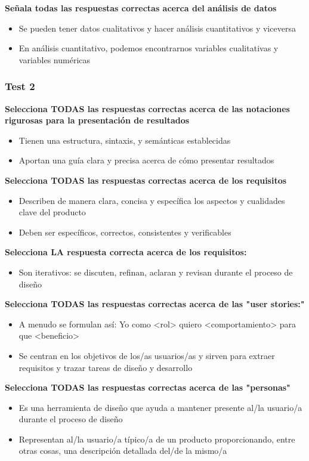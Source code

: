 \documentclass[12pt, twoside, openright]{report} %
\begin{document}
\textbf{Señala todas las respuestas correctas acerca del análisis de datos}
\begin{itemize}
	\item Se pueden tener datos cualitativos y hacer análisis cuantitativos y viceversa
	\item En análisis cuantitativo, podemos encontrarnos variables cualitativas y variables numéricas
\end{itemize}
\pagebreak
\subsubsection{Test 2}

\textbf{Selecciona TODAS las respuestas correctas acerca de las notaciones rigurosas para la presentación de resultados}
\begin{itemize}
	\item Tienen una estructura, sintaxis, y semánticas establecidas
	\item Aportan una guía clara y precisa acerca de cómo presentar resultados
\end{itemize}

\textbf{Selecciona TODAS las respuestas correctas acerca de los requisitos}
\begin{itemize}
	\item Describen de manera clara, concisa y específica los aspectos y cualidades clave del producto
	\item Deben ser específicos, correctos, consistentes y verificables
\end{itemize}

\textbf{Selecciona LA respuesta correcta acerca de los requisitos:}
\begin{itemize}
	\item Son iterativos: se discuten, refinan, aclaran y revisan durante el proceso de diseño
\end{itemize}

\textbf{Selecciona TODAS las respuestas correctas acerca de las "user stories:"}
\begin{itemize}
	\item A menudo se formulan así: Yo como <rol> quiero <comportamiento> para que <beneficio>
	\item Se centran en los objetivos de los/as usuarios/as y sirven para extraer requisitos y trazar tareas de diseño y desarrollo
\end{itemize}

\textbf{Selecciona TODAS las respuestas correctas acerca de las "personas"}
\begin{itemize}
	\item Es una herramienta de diseño que ayuda a mantener presente al/la usuario/a durante el proceso de diseño
	\item Representan al/la usuario/a típico/a de un producto proporcionando, entre otras cosas,  una descripción detallada del/de la mismo/a
\end{itemize}
\end{document}

